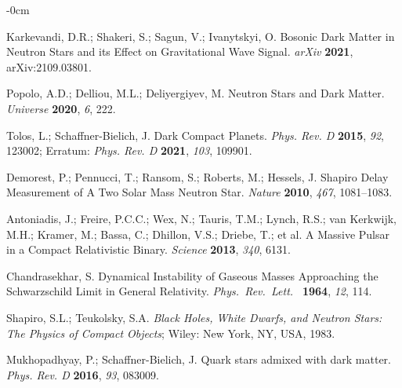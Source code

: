 \documentclass[universe,article,accept,moreauthors,pdftex]{Definitions/mdpi}
\begin{document}
\begin{adjustwidth}{-\extralength}{0cm}
\begin{thebibliography}{999}
Karkevandi, D.R.; Shakeri, S.; Sagun, V.; Ivanytskyi, O. 
Bosonic Dark Matter in Neutron Stars and its Effect on Gravitational Wave Signal. 
\emph{arXiv} \textbf{2021}, arXiv:2109.03801.

Popolo, A.D.; Delliou, M.L.; Deliyergiyev, M. 
Neutron Stars and Dark Matter. 
\emph{Universe} \textbf{2020}, \emph{6}, 222.

Tolos, L.; Schaffner-Bielich, J. 
Dark Compact Planets. 
\emph{Phys. Rev. D} \textbf{2015}, \emph{92}, 123002; 
Erratum: \emph{Phys. Rev. D} \textbf{2021}, \emph{103}, 109901.

Demorest, P.; Pennucci, T.; Ransom, S.; Roberts, M.; Hessels, J. 
Shapiro Delay Measurement of A Two Solar Mass Neutron Star. 
\emph{Nature} \textbf{2010}, \emph{467}, 1081--1083.

Antoniadis, J.; Freire, P.C.C.; Wex, N.; Tauris, T.M.; Lynch, R.S.; van Kerkwijk, M.H.; Kramer, M.; Bassa, C.; Dhillon, V.S.; Driebe, T.; {et al.}
A Massive Pulsar in a Compact Relativistic Binary. 
\emph{Science } \textbf{2013}, \emph{340}, 6131. 

  Chandrasekhar, S. 
Dynamical Instability of Gaseous Masses Approaching the Schwarzschild Limit in General Relativity. 
  \emph{Phys.\ Rev.\ Lett.\ } \textbf{1964}, \emph{12}, 114.

Shapiro, S.L.; Teukolsky, S.A. 
{\it Black Holes, White Dwarfs, and Neutron Stars: The Physics of Compact Objects}; 
Wiley: New York, NY, USA, 1983. %
 

Mukhopadhyay, P.; Schaffner-Bielich, J. 
Quark stars admixed with dark matter. 
\emph{Phys. Rev. D} \textbf{2016}, \emph{93}, 083009.


\end{thebibliography}
\end{adjustwidth}
\end{document}
